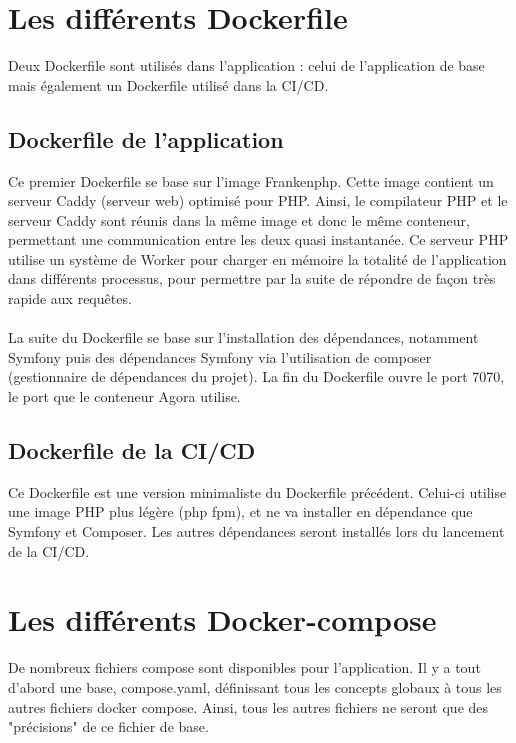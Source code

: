 \documentclass{article}
\begin{document}
    \section{Les différents Dockerfile}

        Deux Dockerfile sont utilisés dans l'application : celui de l'application de base mais également un Dockerfile utilisé dans la CI/CD.

        \subsection{Dockerfile de l'application}

            Ce premier Dockerfile se base sur l'image Frankenphp. Cette image contient un serveur Caddy (serveur web) optimisé pour PHP. Ainsi, le compilateur PHP et le serveur Caddy sont réunis dans la même image et donc le même conteneur, permettant une communication entre les deux quasi instantanée. Ce serveur PHP utilise un système de Worker pour charger en mémoire la totalité de l'application dans différents processus, pour permettre par la suite de répondre de façon très rapide aux requêtes.\\
            \\
            \indent La suite du Dockerfile se base sur l'installation des dépendances, notamment Symfony puis des dépendances Symfony via l'utilisation de composer (gestionnaire de dépendances du projet). La fin du Dockerfile ouvre le port 7070, le port que le conteneur Agora utilise.

        \subsection{Dockerfile de la CI/CD}

            Ce Dockerfile est une version minimaliste du Dockerfile précédent. Celui-ci utilise une image PHP plus légère (php fpm), et ne va installer en dépendance que Symfony et Composer. Les autres dépendances seront installés lors du lancement de la CI/CD.

    \section{Les différents Docker-compose}

        De nombreux fichiers compose sont disponibles pour l'application. Il y a tout d'abord une base, compose.yaml, définissant tous les concepts globaux à tous les autres fichiers docker compose. Ainsi, tous les autres fichiers ne seront que des "précisions" de ce fichier de base.
\end{document}
